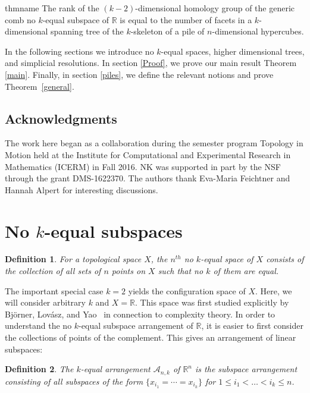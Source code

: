 \documentclass{amsart}
\newcommand{\R}{{\mathbb R}}
\newtheorem{defin}{Definition}
\begin{document}
\begin{restatable}{thm}{name}
\label{general}
The rank of the $(k-2)$-dimensional homology group of the generic comb no $k$-equal subspace of $\R$ is equal to 
the number of facets in a $k$-dimensional spanning tree of the $k$-skeleton of a pile of $n$-dimensional hypercubes.
\end{restatable}


In the following sections we introduce no $k$-equal spaces, higher dimensional trees, and simplicial resolutions.  In section \ref{Proof}, we prove our main result Theorem \ref{main}. Finally, in section \ref{piles}, we define the relevant notions and prove Theorem~\ref{general}.

\subsection{Acknowledgments}
 The work here began as a collaboration during the semester program
 Topology in Motion held at the Institute for Computational and
 Experimental Research in Mathematics (ICERM) in Fall 2016.  NK was
 supported in part by the NSF through the grant DMS-1622370.  The authors
 thank Eva-Maria Feichtner and Hannah Alpert for interesting
 discussions.


\section{No $k$-equal subspaces}



\begin{defin}
For a topological space $X$, the \emph{$n^{th}$ no $k$-equal space of $X$}
consists of the collection of all sets of $n$ points on $X$ such that no $k$ of them are 
equal.  
\end{defin}
The important special case $k=2$ yields the configuration space of $X$.
Here, we will consider arbitrary $k$ and $X = \R$.  This space was first
studied explicitly by Bj\"{o}rner, Lov\'{a}sz,  and Yao~\cite{BLY} in connection to complexity theory.  In order to understand the no $k$-equal subspace arrangement of $\R$, 
 it is easier to first consider the collections of points 
of the complement.
  This gives an arrangement of linear subspaces:  



\begin{defin}
The \emph{$k$-equal arrangement}  $\mathcal{A}_{n, k}$ of $\R^n$ is the subspace arrangement consisting of all subspaces of the form $\{x_{i_1} = \cdots = x_{i_k}\}$ for $1 \leq i_1 < \ldots < i_k \leq n$.
\end{defin}
\end{document}
